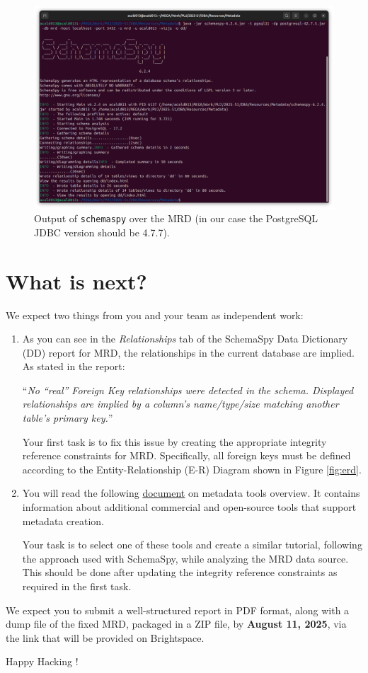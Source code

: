 \documentclass{article}
\begin{document}
\begin{enumerate}
    \begin{figure}[t]
        \includegraphics[width=\textwidth]{figures/output.png}
        \caption{Output of \texttt{schemaspy} over the MRD (in our case the PostgreSQL JDBC version should be 4.7.7).}
        \label{fig:output}
    \end{figure}

\end{enumerate}

\section{What is next?}

We expect two things from you and your team as independent work:

\begin{enumerate}
    \item As you can see in the \textit{Relationships} tab of the SchemaSpy Data Dictionary (DD) report for MRD, the relationships in the current database are implied. As stated in the report:

    ``\textit{No ``real'' Foreign Key relationships were detected in the schema. Displayed relationships are implied by a column's name/type/size matching another table's primary key.}''

    Your first task is to fix this issue by creating the appropriate integrity reference constraints for MRD. Specifically, all foreign keys must be defined according to the Entity-Relationship (E-R) Diagram shown in Figure \ref{fig:erd}.

    \item You will read the following \href{https://drive.google.com/file/d/1jqnAJ4A3AfnrTHHuYTcmOlaBXnUAznP1/view?usp=drive_link}{document} on metadata tools overview. It contains information about additional commercial and open-source tools that support metadata creation.

    Your task is to select one of these tools and create a similar tutorial, following the approach used with SchemaSpy, while analyzing the MRD data source. This should be done after updating the integrity reference constraints as required in the first task.
\end{enumerate}

We expect you to submit a well-structured report in PDF format, along with a dump file of the fixed MRD, packaged in a ZIP file, by \textbf{August 11, 2025}, via the link that will be provided on Brightspace.

\vspace{5mm}
Happy Hacking !
\end{document}
